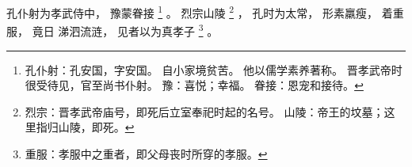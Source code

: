 
\switchcolumn*[\section{}]

孔仆射为孝武侍中，
豫蒙眷接%
\footnote{%
    孔仆射：孔安国，字安国。
            自小家境贫苦。
            他以儒学素养著称。
            晋孝武帝时很受待见，官至尚书仆射。
    豫：喜悦；幸福。
    眷接：恩宠和接待。
}%
。
烈宗山陵%
\footnote{%
    烈宗：晋孝武帝庙号，即死后立室奉祀时起的名号。
    山陵：帝王的坟墓；这里指归山陵，即死。
}%
，
孔时为太常，
形素羸瘦，
着重服，
竟日
涕泗流涟，
见者以为真孝子%
\footnote{%
    重服：孝服中之重者，即父母丧时所穿的孝服。
}%
。

\switchcolumn


